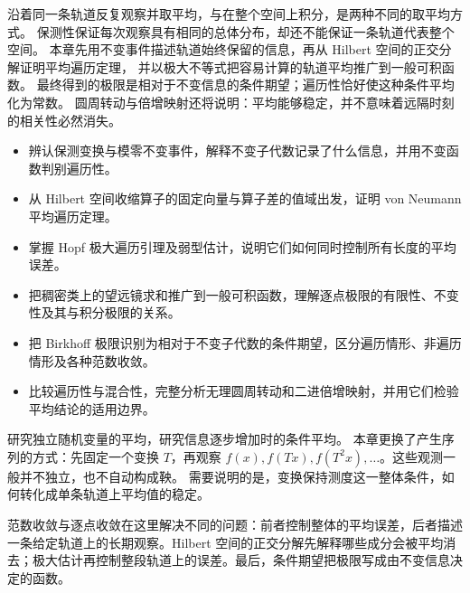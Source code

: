 
\begin{chapterabstract}
沿着同一条轨道反复观察并取平均，与在整个空间上积分，是两种不同的取平均方式。
保测性保证每次观察具有相同的总体分布，却还不能保证一条轨道代表整个空间。
本章先用不变事件描述轨道始终保留的信息，再从 Hilbert 空间的正交分解证明平均遍历定理，
并以极大不等式把容易计算的轨道平均推广到一般可积函数。
最终得到的极限是相对于不变信息的条件期望；遍历性恰好使这种条件平均化为常数。
圆周转动与倍增映射还将说明：平均能够稳定，并不意味着远隔时刻的相关性必然消失。
\end{chapterabstract}

\begin{learninggoals}
\begin{itemize}
\item\label{b1:item:32-goal-invariance}辨认保测变换与模零不变事件，解释不变子代数记录了什么信息，并用不变函数判别遍历性。
\item\label{b1:item:32-goal-hilbert}从 Hilbert 空间收缩算子的固定向量与算子差的值域出发，证明 von Neumann 平均遍历定理。
\item\label{b1:item:32-goal-maximal}掌握 Hopf 极大遍历引理及弱型估计，说明它们如何同时控制所有长度的平均误差。
\item\label{b1:item:32-goal-pointwise}把稠密类上的望远镜求和推广到一般可积函数，理解逐点极限的有限性、不变性及其与积分极限的关系。
\item\label{b1:item:32-goal-identification}把 Birkhoff 极限识别为相对于不变子代数的条件期望，区分遍历情形、非遍历情形及各种范数收敛。
\item\label{b1:item:32-goal-models}比较遍历性与混合性，完整分析无理圆周转动和二进倍增映射，并用它们检验平均结论的适用边界。
\end{itemize}
\end{learninggoals}

研究独立随机变量的平均，研究信息逐步增加时的条件平均。
本章更换了产生序列的方式：先固定一个变换 \(T\)，再观察
\(f(x),f(Tx),f(T^2x),\ldots\)。这些观测一般并不独立，也不自动构成鞅。
需要说明的是，变换保持测度这一整体条件，如何转化成单条轨道上平均值的稳定。

\ProseParagraphBreak

范数收敛与逐点收敛在这里解决不同的问题：前者控制整体的平均误差，后者描述一条给定轨道上的长期观察。Hilbert 空间的正交分解先解释哪些成分会被平均消去；极大估计再控制整段轨道上的误差。最后，条件期望把极限写成由不变信息决定的函数。

